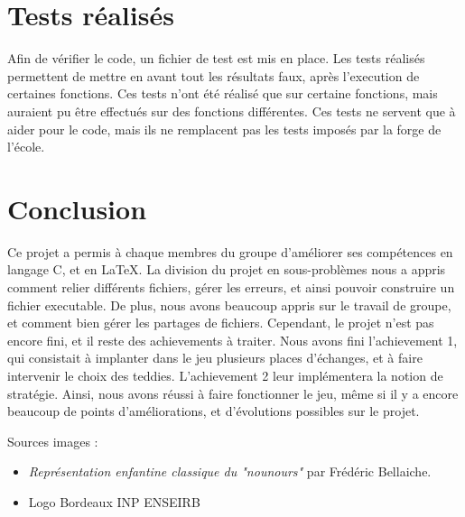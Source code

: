 \documentclass{article}
\begin{document}
\vspace*{25mm}

\section{Tests r\'ealis\'es}
Afin de v\'erifier le code, un fichier de test est mis en place. 
Les tests r\'ealis\'es permettent de mettre en avant tout les r\'esultats faux, apr\`es l'execution de certaines fonctions. 
Ces tests n'ont \'et\'e r\'ealis\'e que sur certaine fonctions, mais auraient 
pu \^etre effectu\'es sur des fonctions diff\'erentes. 
Ces tests ne servent que \`a aider pour le code, mais ils ne remplacent pas les 
tests impos\'es par la forge de l'\'ecole. 
 

\section{Conclusion}

Ce projet a permis \`a chaque membres du groupe d'am\'eliorer ses comp\'etences en langage C, et en \LaTeX.
La division du projet en sous-probl\`emes nous a appris comment relier diff\'erents fichiers, g\'erer les erreurs, et ainsi pouvoir construire un fichier executable.
De plus, nous avons beaucoup appris sur le travail de groupe, et comment bien g\'erer les partages de fichiers. 
Cependant, le projet n'est pas encore fini, et il reste des achievements \`a traiter. Nous avons fini l'achievement 1, qui consistait \`a implanter dans le 
jeu plusieurs places d'\'echanges, et \`a faire intervenir le choix des teddies. L'achievement 2 leur impl\'ementera la notion de strat\'egie. 
Ainsi, nous avons r\'eussi \`a faire fonctionner le jeu, m\^eme si il y a encore beaucoup de points d'am\'eliorations, et d'\'evolutions possibles sur le projet. \\

\vspace*{10mm}

Sources images :
\begin{itemize}

\item\textit{Représentation enfantine classique du "nounours"} par Fr\'ed\'eric Bellaiche.

\item Logo Bordeaux INP ENSEIRB

\end{itemize}
\end{document}
